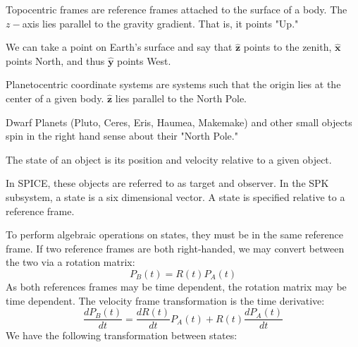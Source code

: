 \documentclass[crop=false,class=article,oneside]{standalone}
\begin{document}
            \begin{definition}
            Topocentric frames are reference frames attached to the surface of a body. The $z-$axis lies parallel to the gravity gradient. That is, it points "Up."
            \end{definition}
            \begin{example}
            We can take a point on Earth's surface and say that $\hat{\mathbf{z}}$ points to the zenith, $\hat{\mathbf{x}}$ points North, and thus $\hat{\mathbf{y}}$ points West.
            \end{example}
            \begin{definition}
            Planetocentric coordinate systems are systems such that the origin lies at the center of a given body. $\hat{\mathbf{z}}$ lies parallel to the North Pole.
            \end{definition}
            \begin{remark}
            Dwarf Planets (Pluto, Ceres, Eris, Haumea, Makemake) and other small objects spin in the right hand sense about their "North Pole."
            \end{remark}
            \begin{definition}
            The state of an object is its position and velocity relative to a given object.
            \end{definition}
            \begin{remark}
            In SPICE, these objects are referred to as target and observer. In the SPK subsystem, a state is a six dimensional vector. A state is specified relative to a reference frame.
            \end{remark}
            To perform algebraic operations on states, they must be in the same reference frame. If two reference frames are both right-handed, we may convert between the two via a rotation matrix:
            \begin{equation}
            P_{B}(t)=R(t)P_{A}(t)
            \end{equation}
            As both references frames may be time dependent, the rotation matrix may be time dependent. The velocity frame transformation is the time derivative:
            \begin{equation}
            \frac{dP_{B}(t)}{dt}=\frac{dR(t)}{dt}P_{A}(t)+R(t)\frac{dP_{A}(t)}{dt}
            \end{equation}
            We have the following transformation between states:
\end{document}

